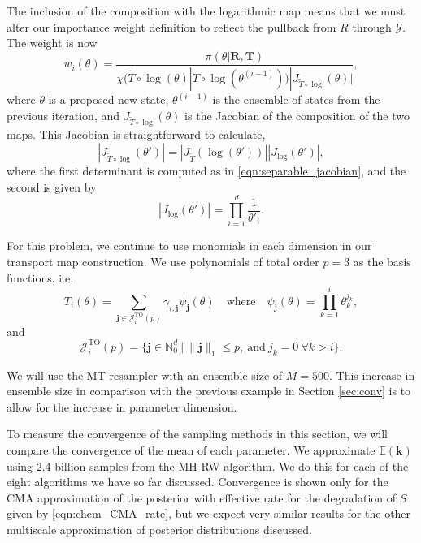 \documentclass[final]{siamltex}
\newcommand{\edit}[1]{#1}
\begin{document}
\edit{ The inclusion of the composition with the logarithmic map} means that we must alter our importance weight definition to reflect the pullback from $R$ through $\mathcal{Y}$. The weight is now
\begin{equation}
	w_i(\theta) = \frac{\pi(\theta|\mathbf{R},\mathbf{T})}{\chi(\tilde{T}\circ\log(\theta)|\tilde{T}\circ\log(\theta^{(i-1)}))|J_{\tilde{T}\circ\log}(\theta)|},
\end{equation}
where $\theta$ is a proposed new state, $\theta^{(i-1)}$ is the ensemble of states from the previous iteration, and $J_{\tilde{T}\circ\log}(\theta)$ is the Jacobian of the composition of the two maps. This Jacobian is straightforward to calculate,
\begin{equation}
	|J_{\tilde{T}\circ\log}(\theta')| = |J_{\tilde{T}}(\log(\theta'))||J_{\log}(\theta')|,
\end{equation}
where the first determinant is computed as in
\eqref{eqn:separable_jacobian}, and the second is given by
\begin{equation}
	|J_{\log}(\theta')| = \prod\limits_{i=1}^d \frac{1}{\theta'_i}.
\end{equation}

For this problem, we continue to use monomials in each dimension in our transport map construction. We use polynomials of total order $p=3$ as the basis functions, i.e.
\begin{equation}
	T_i(\theta) = \sum_{\mathbf{j}\in\mathcal{J}^{\text{TO}}_i(p)} \gamma_{i,\mathbf{j}}\psi_{\mathbf{j}}(\theta) \quad \text{where} \quad \psi_\mathbf{j}(\theta) = \prod\limits_{k=1}^i \theta_k^{j_k},
\end{equation}
and
\begin{equation}
	\mathcal{J}^{\text{TO}}_i(p) = \{\mathbf{j} \in \mathbb{N}^d_0\ |\ \|\mathbf{j}\|_1 \leq p, \ \text{and}\ j_k = 0\ \forall k > i\}.
\end{equation}

We will use the MT\cite{russ2017parallel} resampler with an ensemble size of
$M=500$. This increase in ensemble size in comparison with the previous
example in Section \ref{sec:conv} is to allow for the increase in parameter dimension.

To measure the convergence of the sampling methods in this section, we
will compare the convergence of the mean of each parameter. We
approximate $\mathbb{E}(\mathbf{k})$ using 2.4 billion samples from
the MH-RW algorithm. We do this for each of the eight algorithms we
have so far discussed. Convergence is shown only for the CMA
approximation of the posterior with effective rate for
the degradation of $S$ given by \eqref{eqn:chem_CMA_rate}, but we
expect very similar results for the other multiscale approximation of
posterior distributions
discussed.
\end{document}
